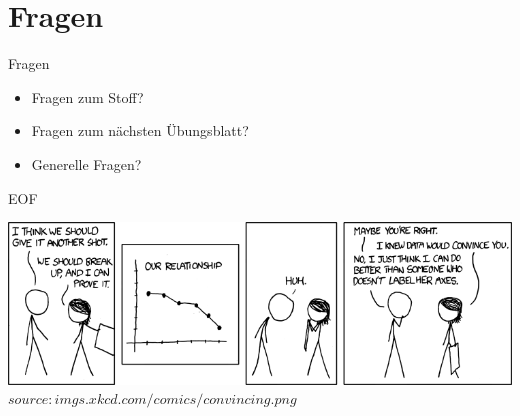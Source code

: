 	
	
	
	\section{Fragen}
	\begin{frame} {Fragen}
		\begin{itemize}
			\item Fragen zum Stoff?
			\item Fragen zum n\"achsten \"Ubungsblatt?
			\item Generelle Fragen?
		\end{itemize}
	\end{frame}
	
	
	\begin{frame} {EOF}
		\begin{center}
			\includegraphics[scale=0.45]{graphics/eof3.png}\\
			\tiny $source: imgs.xkcd.com/comics/convincing.png$
		\end{center}
	\end{frame}


